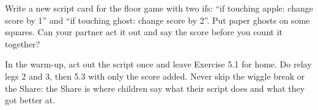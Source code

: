 \begin{stretchchallenge}
Write a new script card for the floor game with two ifs: \enquote{if touching apple: change score by 1} and \enquote{if touching ghost: change score by 2}. Put paper ghosts on some squares. Can your partner act it out and say the score before you count it together?
\end{stretchchallenge}

\begin{teachernote}
In the warm-up, act out the script once and leave Exercise 5.1 for home. Do relay legs 2 and 3, then 5.3 with only the score added. Never skip the wiggle break or the Share: the Share is where children say what their script does and what they got better at.
\end{teachernote}
